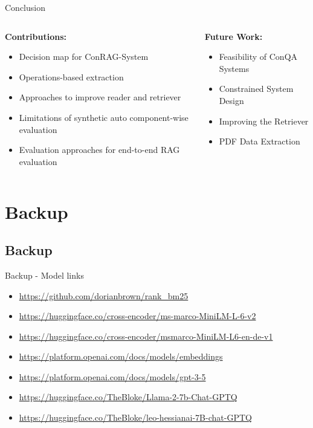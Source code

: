 \documentclass{beamer}
\begin{document}
\begin{frame}{Conclusion}
  \begin{columns}[T]
    \begin{column}{.5\textwidth}
      \textbf{Contributions:}
      \begin{itemize}
        \item Decision map for ConRAG-System
        \item Operations-based extraction
        \item Approaches to improve reader and retriever
        \item Limitations of synthetic auto component-wise evaluation
        \item Evaluation approaches for end-to-end RAG evaluation
      \end{itemize}
    \end{column}
    \begin{column}{.5\textwidth}
      \textbf{Future Work:}
      \begin{itemize}
        \item Feasibility of ConQA Systems
        \item Constrained System Design
        \item Improving the Retriever
        \item PDF Data Extraction
      \end{itemize}
    \end{column}
  \end{columns}
\end{frame}


\section*{Backup}

\subsection*{Backup}

\begin{frame}{Backup - Model links}
  \begin{itemize}
    \item \url{https://github.com/dorianbrown/rank_bm25}
    \item \url{https://huggingface.co/cross-encoder/ms-marco-MiniLM-L-6-v2}
    \item \url{https://huggingface.co/cross-encoder/msmarco-MiniLM-L6-en-de-v1}
    \item \url{https://platform.openai.com/docs/models/embeddings}
    \item \url{https://platform.openai.com/docs/models/gpt-3-5}
    \item \url{https://huggingface.co/TheBloke/Llama-2-7b-Chat-GPTQ}
    \item \url{https://huggingface.co/TheBloke/leo-hessianai-7B-chat-GPTQ}
  \end{itemize}
\end{frame}
\end{document}
